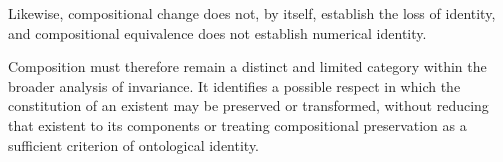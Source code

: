 Likewise, compositional change does not, by itself,
establish the loss of identity, and compositional
equivalence does not establish numerical identity.

Composition must therefore remain a distinct and limited
category within the broader analysis of invariance.
It identifies a possible respect in which the constitution
of an existent may be preserved or transformed, without
reducing that existent to its components or treating
compositional preservation as a sufficient criterion
of ontological identity.

